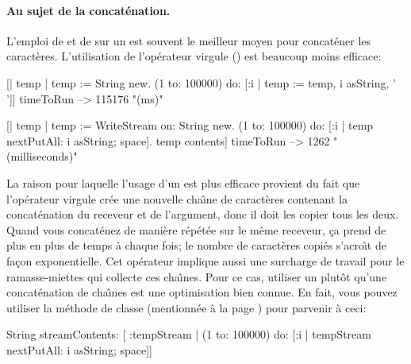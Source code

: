 \documentclass[a4paper,10pt,twoside]{book}
\begin{document}
\paragraph{Au sujet de la concat\'enation.}
L'emploi de  et de  sur un  est souvent le meilleur moyen pour concat\'ener 
les caract\`eres.
L'utilisation de l'op\'erateur virgule (\ct{,}) est beaucoup moins efficace:

\begin{code}{}
[| temp |
  temp := String new.
  (1 to: 100000)
    do: [:i | temp := temp, i asString, ' ']] timeToRun --> 115176 "(ms)"

[| temp |
  temp := WriteStream on: String new.
  (1 to: 100000)
    do: [:i | temp nextPutAll: i asString; space].
  temp contents] timeToRun --> 1262 "(milliseconds)"
\end{code}

La raison pour laquelle l'usage d'un \stream est plus efficace provient
du fait que l'op\'erateur virgule cr\'ee une nouvelle cha\^{\i}ne de caract\`eres
contenant la concat\'enation du receveur et de l'argument, donc il doit
les copier tous les deux.
Quand vous concat\'enez de mani\`ere r\'ep\'et\'ee sur le m\^eme receveur,
	  \c{c}a prend de plus en plus de temps \`a chaque fois; le nombre
	  de caract\`eres copi\'es s'acro\^{\i}t de fa\c{c}on exponentielle.
Cet op\'erateur implique aussi une surcharge de travail pour le ramasse-miettes qui collecte ces cha\^{\i}nes. 
Pour ce cas, utiliser un \stream plut\^ot qu'une concat\'enation de cha\^{\i}nes est une optimisation bien connue.
En fait, vous pouvez utiliser la m\'ethode de classe  (mentionn\'ee \`a la page \pageref{sec:streamContents}) pour parvenir \`a ceci:

\begin{code}{}
String streamContents: [ :tempStream |
  (1 to: 100000)
       do: [:i | tempStream nextPutAll: i asString; space]] 
\end{code}
\end{document}
